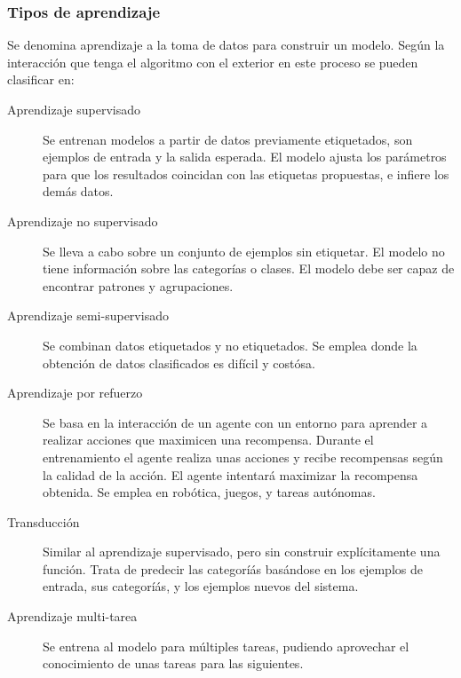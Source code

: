     \subsubsection{Tipos de aprendizaje}
        Se denomina aprendizaje a la toma de datos para construir un modelo. Según la interacción que tenga el algoritmo con el exterior en este proceso se pueden clasificar en:
        \begin{description}
            \item[Aprendizaje supervisado] Se entrenan modelos a partir de datos previamente etiquetados, son ejemplos de entrada y la salida esperada. El modelo ajusta los parámetros para que los resultados coincidan con las etiquetas propuestas, e infiere los demás datos.
            \item[Aprendizaje no supervisado] Se lleva a cabo sobre un conjunto de ejemplos sin etiquetar. El modelo no tiene información sobre las categorías o clases. El modelo debe ser capaz de encontrar patrones y agrupaciones.
            \item[Aprendizaje semi-supervisado] Se combinan datos etiquetados y no etiquetados. Se emplea donde la obtención de datos clasificados es difícil y costósa.
            \item[Aprendizaje por refuerzo] Se basa en la interacción de un agente con un entorno para aprender a realizar acciones que maximicen una recompensa. Durante el entrenamiento el agente realiza unas acciones y recibe recompensas según la calidad de la acción. El agente intentará maximizar la recompensa obtenida. Se emplea en robótica, juegos, y tareas autónomas.
            \item[Transducción] Similar al aprendizaje supervisado, pero sin construir explícitamente una función. Trata de predecir las categoríás basándose en los ejemplos de entrada, sus categoríás, y los ejemplos nuevos del sistema.
            \item[Aprendizaje multi-tarea] Se entrena al modelo para múltiples tareas, pudiendo aprovechar el conocimiento de unas tareas para las siguientes.
        \end{description}
        
